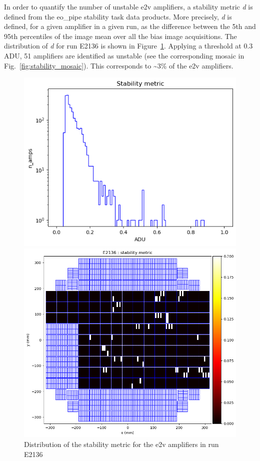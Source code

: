 In order to quantify the number of unstable e2v amplifiers, a stability
metric \emph{d} is defined from the eo\_pipe
stability task data products. More precisely, \emph{d} is defined, for a
given amplifier in a given run, as the difference between the 5th and
95th percentiles of the image mean over all the bias image acquisitions. The
distribution of \emph{d} for run E2136 is shown in Figure~\ref{fig:stability_dist}. Applying a
threshold at 0.3\,ADU, 51 amplifiers are identified as unstable (see the
corresponding mosaic in Fig.~\ref{fig:stability_mosaic}). This corresponds to \textasciitilde3\% of the e2v
amplifiers.

\begin{figure}[htbp]
\centering
\begin{minipage}{0.45\textwidth}
    \centering
    \includegraphics[width=\textwidth]{figures/E2136_distribution_d.png}
    \caption{Distribution of the stability metric for the e2v amplifiers in run E2136}
    \label{fig:stability_dist}
\end{minipage}
\hfill
\begin{minipage}{0.45\textwidth}
    \centering
    \includegraphics[width=\textwidth]{figures/E2136_mosaic_d.png}

\end{minipage}
\end{figure}
